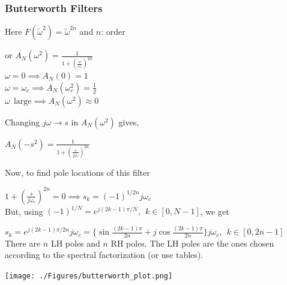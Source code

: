 \documentclass[mathserif, 10pt]{beamer} %
\begin{document}
\frame
{

\small
\frametitle{Butterworth Filters}
\vspace{-.6in}
Here $F(\tilde\omega^2) = \tilde\omega^{2n}$  and  $n$: order\\ \vspace{.1in}

or $A_N(\omega^2) = \frac{1}{1+\left(\frac{\omega}{\omega_c}\right)^{2n}}$\\ \vspace{.1in}
$\omega=0 \implies A_N(0) = 1$\\
$\omega =\omega_c \implies A_N(\omega_c^2) = \frac{1}{2}$\\
$\omega~~\text{large} \implies A_N(\omega^2) \approx 0$ \\ \vspace{.1in}

Changing $j\omega \rightarrow s$ in $A_N(\omega^2)$ gives, \\ \vspace{.1in}

$A_N(-s^2)= \frac{1}{1+\left(\frac{s}{j\omega_c}\right)^{2n}}$ \\ \vspace{.1in}

Now, to find pole locations of this filter \\ \vspace{.1in}

$1+\left(\frac{s}{j\omega_c}\right)^{2n}=0 \implies s_k =(-1)^{1/2n} j\omega_c$\\ \vspace{.1in}
But, using $(-1)^{1/N}=e^{j(2k-1)\pi/N}, ~~k \in [0,N-1]$, we get \\ \vspace{.1in}

$s_k =e^{j(2k-1)\pi/2n} j\omega_c= \{\sin \frac{(2k-1)\pi}{2n}+j \cos \frac{(2k-1)\pi}{2n}\} j\omega_c, ~~ k \in [0,2n-1]$ \\

There are $n$ LH poles and $n$ RH poles. The LH poles are the ones chosen according to the spectral factorization (or use tables).

\vspace{-2.7in}
\hspace{2.2in}
\texttt{[image: ./Figures/butterworth\_plot.png]}

}
\end{document}
